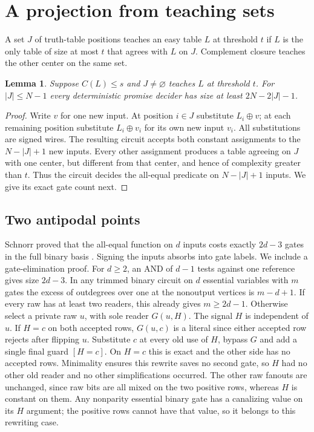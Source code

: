 \documentclass[11pt]{article}
\newtheorem{lemma}[theorem]{Lemma}
\begin{document}
\section{A projection from teaching sets}
A set $J$ of truth-table positions teaches an easy table $L$ at threshold $t$ if $L$ is the only table of size at most $t$ that agrees with $L$ on $J$. Complement closure teaches the other center on the same set.
\begin{lemma}
Suppose $C(L)\le s$ and $J\ne\varnothing$ teaches $L$ at threshold $t$. For $|J|\le N-1$ every deterministic promise decider has size at least $2N-2|J|-1$.
\end{lemma}
\begin{proof}
Write $v$ for one new input. At position $i\in J$ substitute $L_i\oplus v$; at each remaining position substitute $L_i\oplus v_i$ for its own new input $v_i$. All substitutions are signed wires. The resulting circuit accepts both constant assignments to the $N-|J|+1$ new inputs. Every other assignment produces a table agreeing on $J$ with one center, but different from that center, and hence of complexity greater than $t$. Thus the circuit decides the all-equal predicate on $N-|J|+1$ inputs. We give its exact gate count next.
\end{proof}
\subsection{Two antipodal points}
Schnorr proved that the all-equal function on \(d\) inputs costs exactly \(2d-3\) gates in the full binary basis \cite{schnorr}. Signing the inputs absorbs into gate labels. We include a gate-elimination proof.
For \(d\ge2\), an AND of \(d-1\) tests against one reference gives size \(2d-3\). In any trimmed binary circuit on \(d\) essential variables with \(m\) gates the excess of outdegrees over one at the nonoutput vertices is \(m-d+1\). If every raw has at least two readers, this already gives \(m\ge2d-1\). Otherwise select a private raw \(u\), with sole reader \(G(u,H)\). The signal \(H\) is independent of \(u\). If \(H=c\) on both accepted rows, \(G(u,c)\) is a literal since either accepted row rejects after flipping \(u\). Substitute \(c\) at every old use of \(H\), bypass \(G\) and add a single final guard \([H=c]\). On \(H=c\) this is exact and the other side has no accepted rows. Minimality ensures this rewrite saves no second gate, so \(H\) had no other old reader and no other simplifications occurred. The other raw fanouts are unchanged, since raw bits are all mixed on the two positive rows, whereas \(H\) is constant on them. Any nonparity essential binary gate has a canalizing value on its \(H\) argument; the positive rows cannot have that value, so it belongs to this rewriting case.
\end{document}
